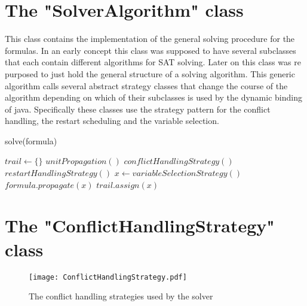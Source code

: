 \section{The "SolverAlgorithm" class}

This class contains the implementation of the general solving procedure for the formulas. In an early concept this class was supposed to have several subclasses that each contain different algorithms for SAT solving. Later on this class was re purposed to just hold the general structure of a solving algorithm. This generic algorithm calls several abstract strategy classes that change the course of the algorithm depending on which of their subclasses is used by the dynamic binding of java. Specifically these classes use the strategy pattern for the conflict handling, the restart scheduling and the variable selection.

\begin{algorithm}
\caption{solve(formula)}\label{alg:cap}
\begin{algorithmic}
\State $trail \gets \{\}$
	\State $unitPropagation()$
	\State $conflictHandlingStrategy()$
	\State $restartHandlingStrategy()$
\Else
    \State $x \gets variableSelectionStrategy()$
    \State $formula.propagate(x)$
    \State $trail.assign(x)$
\EndIf
\EndWhile
\end{algorithmic}
\end{algorithm}

\section{The "ConflictHandlingStrategy" class}

\begin{figure}[htbp]
  \centering
  \texttt{[image: ConflictHandlingStrategy.pdf]}	
  \caption{The conflict handling strategies used by the solver}
  \label{fig:conflictHandling}
\end{figure}

